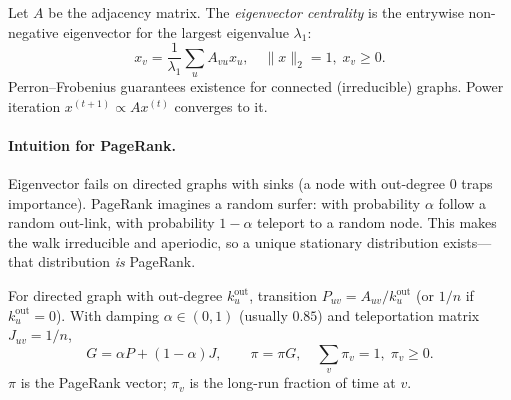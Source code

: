 \begin{definition}\label{def:eigen}
Let $A$ be the adjacency matrix. The \emph{eigenvector centrality} is the entrywise non-negative eigenvector for the largest eigenvalue $\lambda_1$:
\begin{equation}
x_v=\frac1{\lambda_1}\sum_{u}A_{vu}x_u,\quad \|x\|_2=1,\;x_v\ge0.
\end{equation}
Perron--Frobenius guarantees existence for connected (irreducible) graphs. Power iteration $x^{(t+1)}\propto Ax^{(t)}$ converges to it.
\end{definition}

\paragraph{Intuition for PageRank.} Eigenvector fails on directed graphs with sinks (a node with out-degree 0 traps importance). PageRank imagines a random surfer: with probability $\alpha$ follow a random out-link, with probability $1-\alpha$ teleport to a random node. This makes the walk irreducible and aperiodic, so a unique stationary distribution exists---that distribution \emph{is} PageRank.

\begin{definition}[PageRank]\label{def:pagerank}
For directed graph with out-degree $k^{\text{out}}_u$, transition $P_{uv}=A_{uv}/k^{\text{out}}_u$ (or $1/n$ if $k^{\text{out}}_u=0$). With damping $\alpha\in(0,1)$ (usually $0.85$) and teleportation matrix $J_{uv}=1/n$,
\begin{equation}
G=\alpha P+(1-\alpha)J,\qquad \pi=\pi G,\quad \sum_v\pi_v=1,\;\pi_v\ge0.
\end{equation}
$\pi$ is the PageRank vector; $\pi_v$ is the long-run fraction of time at $v$.
\end{definition}

